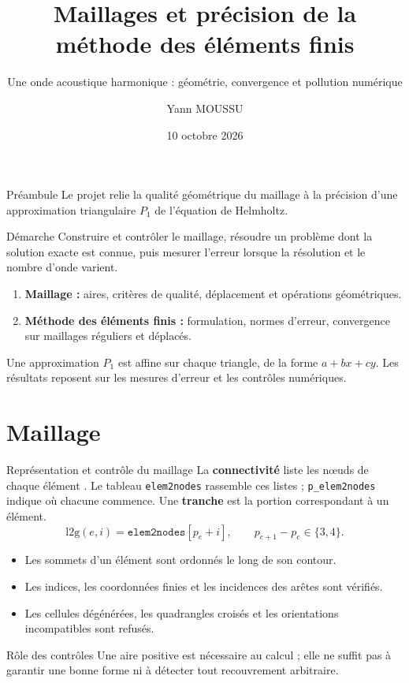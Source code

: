 \documentclass[12pt,aspectratio=169,t]{beamer}
\title{Maillages et précision de la méthode des éléments finis}
\subtitle{Une onde acoustique harmonique : géométrie, convergence et pollution numérique}
\author{Yann MOUSSU}
\institute{CentraleSupélec}
\date{10 octobre 2026}
\begin{document}
\begin{frame}\titlepage\end{frame}

\begin{frame}{Préambule}
Le projet relie la qualité géométrique du maillage à la précision d'une approximation triangulaire $P_1$ de l'équation de Helmholtz.
\begin{block}{Démarche}
Construire et contrôler le maillage, résoudre un problème dont la solution exacte est connue, puis mesurer l'erreur lorsque la résolution et le nombre d'onde varient.
\end{block}
\begin{enumerate}
\item \textbf{Maillage :} aires, critères de qualité, déplacement et opérations géométriques.
\item \textbf{Méthode des éléments finis :} formulation, normes d'erreur, convergence sur maillages réguliers et déplacés.
\end{enumerate}
Une approximation $P_1$ est affine sur chaque triangle, de la forme $a+bx+cy$. Les résultats reposent sur les mesures d'erreur et les contrôles numériques.
\end{frame}

\section{Maillage}
\begin{frame}{Représentation et contrôle du maillage}
La \textbf{connectivité} liste les nœuds de chaque élément \cite{structure}. Le tableau \texttt{elem2nodes} rassemble ces listes ; \texttt{p\_elem2nodes} indique où chacune commence. Une \textbf{tranche} est la portion correspondant à un élément.
\[
\mathrm{l2g}(e,i)=\texttt{elem2nodes}[p_e+i],\qquad
p_{e+1}-p_e\in\{3,4\}.
\]
\begin{itemize}
\item Les sommets d'un élément sont ordonnés le long de son contour.
\item Les indices, les coordonnées finies et les incidences des arêtes sont vérifiés.
\item Les cellules dégénérées, les quadrangles croisés et les orientations incompatibles sont refusés.
\end{itemize}
\begin{block}{Rôle des contrôles}
Une aire positive est nécessaire au calcul ; elle ne suffit pas à garantir une bonne forme ni à détecter tout recouvrement arbitraire.
\end{block}
\end{frame}
\end{document}

